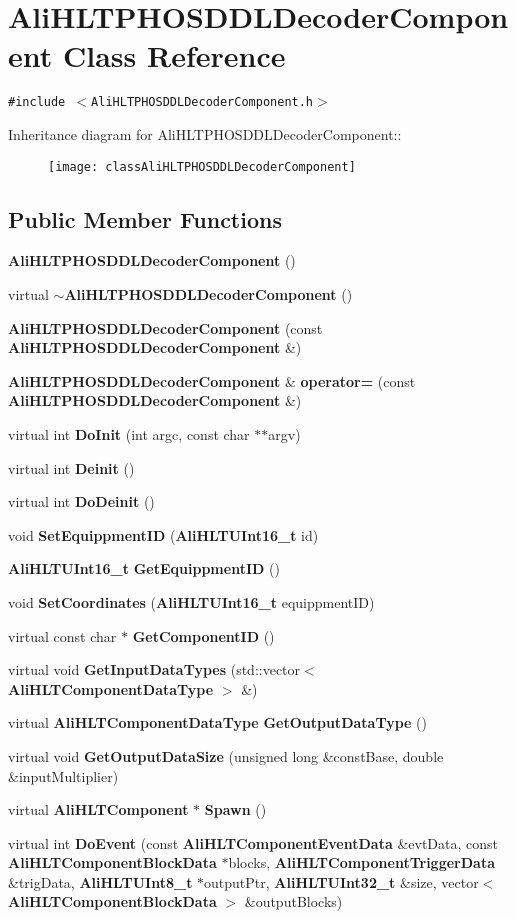 \section{Ali\-HLTPHOSDDLDecoder\-Component Class Reference}
\label{classAliHLTPHOSDDLDecoderComponent}
{\tt \#include $<$Ali\-HLTPHOSDDLDecoder\-Component.h$>$}

Inheritance diagram for Ali\-HLTPHOSDDLDecoder\-Component::\begin{figure}[H]
\begin{center}
\leavevmode
\texttt{[image: classAliHLTPHOSDDLDecoderComponent]}
\end{center}
\end{figure}
\subsection*{Public Member Functions}
\begin{CompactItemize}
\item 
{\bf Ali\-HLTPHOSDDLDecoder\-Component} ()
\item 
virtual {\bf $\sim$Ali\-HLTPHOSDDLDecoder\-Component} ()
\item 
{\bf Ali\-HLTPHOSDDLDecoder\-Component} (const {\bf Ali\-HLTPHOSDDLDecoder\-Component} \&)
\item 
{\bf Ali\-HLTPHOSDDLDecoder\-Component} \& {\bf operator=} (const {\bf Ali\-HLTPHOSDDLDecoder\-Component} \&)
\item 
virtual int {\bf Do\-Init} (int argc, const char $\ast$$\ast$argv)
\item 
virtual int {\bf Deinit} ()
\item 
virtual int {\bf Do\-Deinit} ()
\item 
void {\bf Set\-Equippment\-ID} ({\bf Ali\-HLTUInt16\_\-t} id)
\item 
{\bf Ali\-HLTUInt16\_\-t} {\bf Get\-Equippment\-ID} ()
\item 
void {\bf Set\-Coordinates} ({\bf Ali\-HLTUInt16\_\-t} equippment\-ID)
\item 
virtual const char $\ast$ {\bf Get\-Component\-ID} ()
\item 
virtual void {\bf Get\-Input\-Data\-Types} (std::vector$<$ {\bf Ali\-HLTComponent\-Data\-Type} $>$ \&)
\item 
virtual {\bf Ali\-HLTComponent\-Data\-Type} {\bf Get\-Output\-Data\-Type} ()
\item 
virtual void {\bf Get\-Output\-Data\-Size} (unsigned long \&const\-Base, double \&input\-Multiplier)
\item 
virtual {\bf Ali\-HLTComponent} $\ast$ {\bf Spawn} ()
\item 
virtual int {\bf Do\-Event} (const {\bf Ali\-HLTComponent\-Event\-Data} \&evt\-Data, const {\bf Ali\-HLTComponent\-Block\-Data} $\ast$blocks, {\bf Ali\-HLTComponent\-Trigger\-Data} \&trig\-Data, {\bf Ali\-HLTUInt8\_\-t} $\ast$output\-Ptr, {\bf Ali\-HLTUInt32\_\-t} \&size, vector$<$ {\bf Ali\-HLTComponent\-Block\-Data} $>$ \&output\-Blocks)
\end{CompactItemize}
